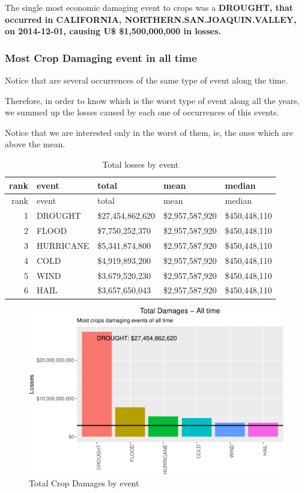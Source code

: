 \documentclass[]{article}
\begin{document}
The single most economic damaging event to crops was a \textbf{DROUGHT,
that occurred in CALIFORNIA, NORTHERN.SAN.JOAQUIN.VALLEY, on 2014-12-01,
causing U\$ \$1,500,000,000 in losses.}

\subsubsection{Most Crop Damaging event in all
time}\label{most-crop-damaging-event-in-all-time}

Notice that are several occurrences of the same type of event along the
time.

Therefore, in order to know which is the worst type of event along all
the years, we summed up the losses caused by each one of occurrences of
this events.

Notice that we are interested only in the worst of them, ie, the ones
which are above the mean.

\begin{longtable}[]{@{}rllll@{}}
\caption{Total losses by event}\tabularnewline
\toprule
rank & event & total & mean & median\tabularnewline
\midrule
\endfirsthead
\toprule
rank & event & total & mean & median\tabularnewline
\midrule
\endhead
1 & DROUGHT & \$27,454,862,620 & \$2,957,587,920 &
\$450,448,110\tabularnewline
2 & FLOOD & \$7,750,252,370 & \$2,957,587,920 &
\$450,448,110\tabularnewline
3 & HURRICANE & \$5,341,874,800 & \$2,957,587,920 &
\$450,448,110\tabularnewline
4 & COLD & \$4,919,893,200 & \$2,957,587,920 &
\$450,448,110\tabularnewline
5 & WIND & \$3,679,520,230 & \$2,957,587,920 &
\$450,448,110\tabularnewline
6 & HAIL & \$3,657,650,043 & \$2,957,587,920 &
\$450,448,110\tabularnewline
\bottomrule
\end{longtable}

\begin{figure}[htbp]
\centering
\includegraphics{readme_files/figure-latex/crop-all-plot-1.pdf}
\caption{Total Crop Damages by event}
\end{figure}
\end{document}
